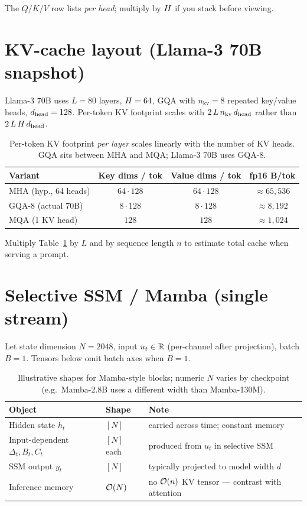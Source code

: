 \noindent
The \(Q/K/V\) row lists \emph{per head}; multiply by \(H\) if you stack
before viewing.

\section*{KV-cache layout (Llama-3 70B snapshot)}

Llama-3 70B uses \(L = 80\) layers, \(H = 64\), GQA with \(n_{\text{kv}} = 8\)
repeated key/value heads, \(d_{\text{head}} = 128\). Per-token KV footprint scales with
\(2\,L\,n_{\text{kv}}\,d_{\text{head}}\) rather than \(2\,L\,H\,d_{\text{head}}\).

\begin{table}[htbp]
\centering
\small
\begin{tabular}{@{}lccc@{}}
\toprule
Variant & Key dims / tok & Value dims / tok & fp16 B/tok \\
\midrule
MHA (hyp., 64 heads) & \(64 \cdot 128\) & \(64 \cdot 128\) & \(\approx 65{,}536\) \\
GQA-8 (actual 70B) & \(8 \cdot 128\) & \(8 \cdot 128\) & \(\approx 8{,}192\) \\
MQA (1 KV head) & \(128\) & \(128\) & \(\approx 1{,}024\) \\
\bottomrule
\end{tabular}
\caption{Per-token KV footprint \emph{per layer} scales linearly with the
number of KV heads. GQA sits between MHA and MQA; Llama-3 70B uses GQA-8.}
\label{tab:kv-variants}
\end{table}

\noindent
Multiply Table~\ref{tab:kv-variants} by \(L\) and by sequence length \(n\) to
estimate total cache when serving a prompt.

\section*{Selective SSM / Mamba (single stream)}

Let state dimension \(N = 2048\), input \(u_t \in \mathbb{R}\) (per-channel after
projection), batch \(B=1\). Tensors below omit batch axes when \(B=1\).

\begin{table}[htbp]
\centering
\small
\begin{tabular}{@{}lll@{}}
\toprule
Object & Shape & Note \\
\midrule
Hidden state \(h_t\) & \([N]\) & carried across time; constant memory \\
Input-dependent \(\Delta_t, B_t, C_t\) & \([N]\) each & produced from \(u_t\) in selective SSM \\
SSM output \(y_t\) & \([N]\) & typically projected to model width \(d\) \\
Inference memory & \(\mathcal{O}(N)\) & no \(\mathcal{O}(n)\) KV tensor --- contrast with attention \\
\bottomrule
\end{tabular}
\caption{Illustrative shapes for Mamba-style blocks; numeric \(N\) varies by
checkpoint (e.g.\ Mamba-2.8B uses a different width than Mamba-130M).}
\label{tab:mamba-shapes}
\end{table}
